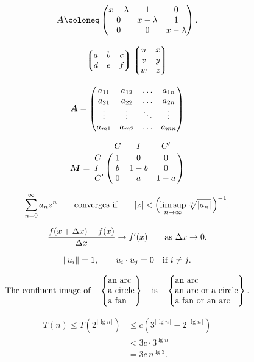 
\[\mat{A} \coloneq \begin{pmatrix}x-\lambda&1&0\\
0&x-\lambda&1\\
0&0&x-\lambda\end{pmatrix}.\]

\[\left\lgroup\begin{matrix}a&b&c\\ d&e&f\\\end{matrix}\right\rgroup
\left\lgroup\begin{matrix}u&x\cr v&y\cr w&z\end{matrix}\right\rgroup\]


\[\bm{A} = \begin{pmatrix}a_{11}&a_{12}&\ldots&a_{1n}\\
a_{21}&a_{22}&\ldots&a_{2n}\\
\vdots&\vdots&\ddots&\vdots\\
a_{m1}&a_{m2}&\ldots&a_{mn}\end{pmatrix}\]

\[\mat{M}=\bordermatrix{&C&I&C'\cr
C&1&0&0\cr I&b&1-b&0\cr C'&0&a&1-a}\]


\[\sum_{n=0}^\infty a_nz^n\qquad\hbox{converges if}\qquad
|z|<\Bigl(\limsup_{n\to\infty}\root n\of{|a_n|}\,\Bigr)^{-1}.\]

\[\frac{f(x+\Delta x)-f(x)}{\Delta x}\to f'(x)
\qquad \hbox{as $\Delta x\to0$.}\]

\[\|u_i\|=1,\qquad u_i\cdot u_j=0\quad\hbox{if $i\ne j$.}\]


\[\it\hbox{The confluent image of}\quad
\begin{Bmatrix}\hbox{an arc}\hfill\\\hbox{a circle}\hfill\\
\hbox{a fan}\hfill\\\end{Bmatrix}
\quad\hbox{is}\quad
\begin{Bmatrix}\hbox{an arc}\hfill\\
\hbox{an arc or a circle}\hfill\\
\hbox{a fan or an arc}\hfill\end{Bmatrix}.\]


\begin{align*}
T(n)\le T(2^{\lceil\lg n\rceil})
&\le c(3^{\lceil\lg n\rceil}-2^{\lceil\lg n\rceil})\\
&<3c\cdot3^{\lg n}\\
&=3c\,n^{\lg3}.
\end{align*}


